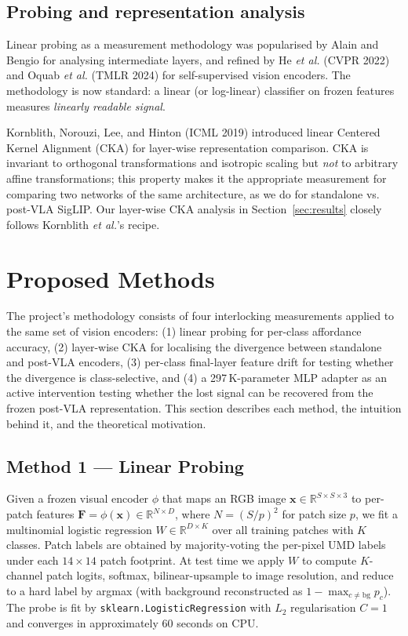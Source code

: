 \documentclass[11pt]{article}
\begin{document}
\subsection{Probing and representation analysis}

Linear probing as a measurement methodology was popularised by Alain and
Bengio \cite{alain2017probes} for analysing intermediate layers, and
refined by He \emph{et al.} (CVPR 2022) \cite{he2022masked} and Oquab
\emph{et al.} (TMLR 2024) \cite{oquab2024dinov2} for self-supervised
vision encoders. The methodology is now standard: a linear (or
log-linear) classifier on frozen features measures \emph{linearly
readable signal}.

Kornblith, Norouzi, Lee, and Hinton (ICML 2019)
\cite{kornblith2019cka} introduced linear Centered Kernel Alignment
(CKA) for layer-wise representation comparison. CKA is invariant to
orthogonal transformations and isotropic scaling but \emph{not} to
arbitrary affine transformations; this property makes it the appropriate
measurement for comparing two networks of the same architecture, as we
do for standalone vs. post-VLA SigLIP. Our layer-wise CKA analysis in
Section~\ref{sec:results} closely follows Kornblith \emph{et al.}'s
recipe.

\section{Proposed Methods}
\label{sec:methods}

The project's methodology consists of four interlocking measurements
applied to the same set of vision encoders: (1) linear probing for
per-class affordance accuracy, (2) layer-wise CKA for localising the
divergence between standalone and post-VLA encoders, (3) per-class
final-layer feature drift for testing whether the divergence is
class-selective, and (4) a 297\,K-parameter MLP adapter as an active
intervention testing whether the lost signal can be recovered from
the frozen post-VLA representation. This section describes each method,
the intuition behind it, and the theoretical motivation.

\subsection{Method 1 --- Linear Probing}

Given a frozen visual encoder $\phi$ that maps an RGB image
$\mathbf{x} \in \mathbb{R}^{S \times S \times 3}$ to per-patch features
$\mathbf{F} = \phi(\mathbf{x}) \in \mathbb{R}^{N \times D}$, where
$N = (S/p)^2$ for patch size $p$, we fit a multinomial logistic
regression $W \in \mathbb{R}^{D \times K}$ over all training patches
with $K$ classes. Patch labels are obtained by majority-voting the
per-pixel UMD labels under each $14 \times 14$ patch footprint. At
test time we apply $W$ to compute $K$-channel patch logits, softmax,
bilinear-upsample to image resolution, and reduce to a hard label by
argmax (with background reconstructed as $1 - \max_{c \neq \mathrm{bg}} p_c$).
The probe is fit by \texttt{sklearn.LogisticRegression} with $L_2$
regularisation $C = 1$ and converges in approximately 60 seconds on
CPU.
\end{document}
